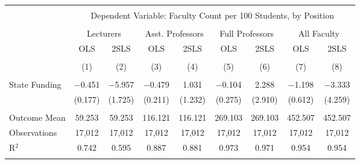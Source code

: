 
\begin{tabular}{@{\extracolsep{5pt}}lcccccccc} 
\\[-1.8ex]\hline 
\hline \\[-1.8ex] 
 & \multicolumn{8}{c}{Dependent Variable: Faculty Count per 100 Students, by Position} \\ 
\cline{2-9} 
\\[-1.8ex] & \multicolumn{2}{c}{Lecturers} & \multicolumn{2}{c}{Asst. Professors} & \multicolumn{2}{c}{Full Professors} & \multicolumn{2}{c}{All Faculty} \\ 
 & OLS & 2SLS & OLS & 2SLS & OLS & 2SLS & OLS & 2SLS \\ 
\\[-1.8ex] & (1) & (2) & (3) & (4) & (5) & (6) & (7) & (8)\\ 
\hline \\[-1.8ex] 
 State Funding & $-$0.451 & $-$5.957 & $-$0.479 & 1.031 & $-$0.104 & 2.288 & $-$1.198 & $-$3.333 \\ 
  & (0.177) & (1.725) & (0.211) & (1.232) & (0.275) & (2.910) & (0.612) & (4.259) \\ 
 \hline \\[-1.8ex] 
Outcome Mean & 59.253 & 59.253 & 116.121 & 116.121 & 269.103 & 269.103 & 452.507 & 452.507 \\ 
Observations & 17,012 & 17,012 & 17,012 & 17,012 & 17,012 & 17,012 & 17,012 & 17,012 \\ 
R$^{2}$ & 0.742 & 0.595 & 0.887 & 0.881 & 0.973 & 0.971 & 0.954 & 0.954 \\ 
\hline 
\hline \\[-1.8ex] 
\end{tabular} 
